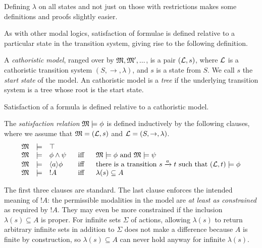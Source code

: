 \NI Defining $\lambda$ on all states and not just on those with
restrictions makes some definitions and proofs slightly easier.

As with other modal logics, satisfaction of formulae is defined
relative to a particular state in the transition system, giving
rise to the following definition.

\begin{definition}
A \emph{cathoristic model}, ranged over by $\frak{M}, \frak{M}', ...$, is a
pair $(\mathcal{L}, s)$, where $\mathcal{L}$ is a cathoristic transition system $(S,
\rightarrow, \lambda)$, and $s$ is a state from $S$. We call $s$ the
\emph{start state} of the model.  An cathoristic model 
 is a \emph{tree} if the underlying transition system is a tree
whose root is the start state.
\end{definition}

\NI Satisfaction of a formula is defined relative to a cathoristic model.

\begin{definition}\label{ELsatisfaction}
The \emph{satisfaction relation} $\frak{M} \models \phi$ is defined
inductively by the following clauses, where we assume that $\frak{M} =
(\mathcal{L}, s)$ and $\mathcal{L} = (S, \rightarrow, \lambda)$.
\[
\begin{array}{lclcl}
  \frak{M} & \models & \top   \\
  \frak{M} & \models & \phi \land \psi &\ \mbox{ iff } \ & \frak{M}  \models \phi \mbox { and } \frak{M} \models \psi  \\
  \frak{M} & \models & \langle a \rangle \phi & \mbox{ iff } & \text{there is a transition } s \xrightarrow{a} t \mbox { such that } (\mathcal{L}, t) \models \phi  \\
  \frak{M} & \models & ! A &\mbox{ iff } & \lambda(s) \subseteq A
\end{array}
\]
\end{definition}

\NI The first three clauses are standard. The last clause enforces the
intended meaning of $!A$: the permissible modalities in the model are
\emph{at least as constrained} as required by $!A$. They may even be
more constrained if the inclusion $\lambda(s) \subseteq A$ is
proper. For infinite sets $\Sigma$ of actions, allowing $\lambda(s)$
to return arbitrary infinite sets in addition to $\Sigma$ does not
make a difference because $A$ is finite by construction, so
$\lambda(s) \subseteq A$ can never hold anyway for infinite
$\lambda(s)$.



